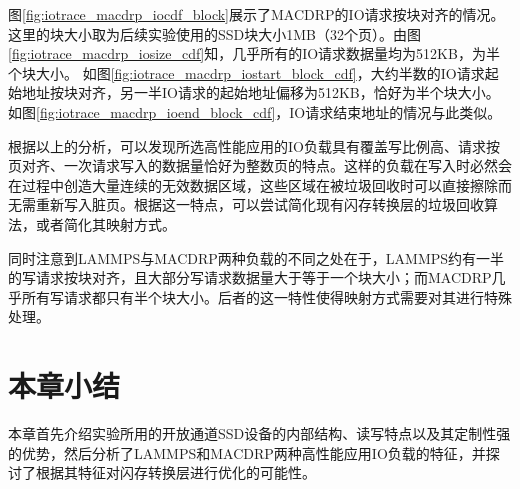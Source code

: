 图\ref{fig:iotrace_macdrp_iocdf_block}展示了MACDRP的IO请求按块对齐的情况。这里的块大小取为后续实验使用的SSD块大小1MB（32个页）。由图\ref{fig:iotrace_macdrp_iosize_cdf}知，几乎所有的IO请求数据量均为512KB，为半个块大小。 如图\ref{fig:iotrace_macdrp_iostart_block_cdf}，大约半数的IO请求起始地址按块对齐，另一半IO请求的起始地址偏移为512KB，恰好为半个块大小。如图\ref{fig:iotrace_macdrp_ioend_block_cdf}，IO请求结束地址的情况与此类似。

根据以上的分析，可以发现所选高性能应用的IO负载具有覆盖写比例高、请求按页对齐、一次请求写入的数据量恰好为整数页的特点。这样的负载在写入时必然会在过程中创造大量连续的无效数据区域，这些区域在被垃圾回收时可以直接擦除而无需重新写入脏页。根据这一特点，可以尝试简化现有闪存转换层的垃圾回收算法，或者简化其映射方式。

同时注意到LAMMPS与MACDRP两种负载的不同之处在于，LAMMPS约有一半的写请求按块对齐，且大部分写请求数据量大于等于一个块大小；而MACDRP几乎所有写请求都只有半个块大小。后者的这一特性使得映射方式需要对其进行特殊处理。

\section{本章小结}
本章首先介绍实验所用的开放通道SSD设备的内部结构、读写特点以及其定制性强的优势，然后分析了LAMMPS和MACDRP两种高性能应用IO负载的特征，并探讨了根据其特征对闪存转换层进行优化的可能性。